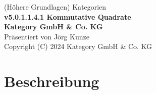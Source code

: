 \documentclass[a4paper]{amsart}
\theoremstyle{definition}
\begin{document}
\begin{titlepage}
\centering
{\huge
(Höhere Grundlagen) Kategorien\\[1cm]
\textbf{v5.0.1.1.4.1 Kommutative Quadrate}
}\\[1cm]

\textbf{Kategory GmbH \& Co. KG}\\
Präsentiert von Jörg Kunze\\
Copyright (C) 2024 Kategory GmbH \& Co. KG

\end{titlepage}

%

\newpage

\section*{Beschreibung}

\end{document}
